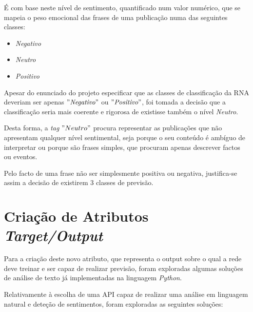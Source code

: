 É com base neste nível de sentimento, quantificado num valor numérico, que se mapeia o peso emocional das frases de uma publicação numa das seguintes classes:

\begin{multicols}{3}
\begin{itemize}
    \item \textit{Negativo}
    \item \textit{Neutro}
    \item \textit{Positivo}
\end{itemize}
\end{multicols}

Apesar do enunciado do projeto especificar que as classes de classificação da RNA deveriam ser apenas $"\textit{Negativo}"$ ou $"\textit{Positivo}"$, foi tomada a decisão que a classificação seria mais coerente e rigorosa de existisse também o nível \textit{Neutro}.

Desta forma, a \textit{tag} $"Neutro"$ procura representar as publicações que não apresentam qualquer nível sentimental, seja porque o seu conteúdo é ambíguo de interpretar ou porque são frases simples, que procuram apenas descrever factos ou eventos. 

Pelo facto de uma frase não ser simplesmente positiva ou negativa, justifica-se assim a decisão de existirem 3 classes de previsão. 


\section{Criação de Atributos \textit{Target/Output}}
\label{sec:CriacaoTarget}

Para a criação deste novo atributo, que representa o output sobre o qual a rede deve treinar e ser capaz de realizar previsão, foram exploradas algumas soluções de análise de texto já implementadas na linguagem \textit{Python}. 

Relativamente à escolha de uma API capaz de realizar uma análise em linguagem natural e deteção de sentimentos, foram exploradas as seguintes soluções:

